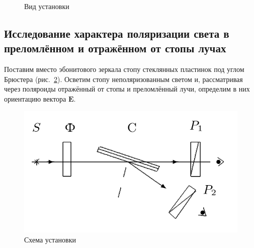 \documentclass[a4paper, 12pt]{article}
\begin{document}
\begin{figure}[h!]
\begin{minipage}[h!]{0.3\linewidth}
		\end{minipage}
		\hfill
		\begin{minipage}[h!]{0.3\linewidth}
		\end{minipage}
		\hfill
        \caption{Вид установки}
        \label{fig:ebonit}
\end{figure}

\newpage

\subsection{Исследование характера поляризации света в преломлённом и отражённом от стопы лучах}

Поставим вместо эбонитового зеркала стопу стеклянных пластинок под углом Брюстера (рис.~\ref{fig:stopa_ust}). Осветим стопу неполяризованным светом и, рассматривая через поляроиды отражённый от стопы и преломлённый лучи, определим в них ориентацию вектора $\mathbf{E}$.

\begin{figure}[h!]
\begin{center}
   \includegraphics[width=0.8\linewidth]{stopa_ust.png}
\end{center}
\caption{Схема установки}
\label{fig:stopa_ust}
\end{figure}
\end{document}
